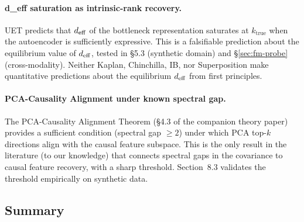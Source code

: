 \paragraph{d\_eff saturation as intrinsic-rank recovery.}
UET predicts that $d_{\mathrm{eff}}$ of the bottleneck representation saturates at
$k_\mathrm{true}$ when the autoencoder is sufficiently expressive.
This is a falsifiable prediction about the equilibrium value of $d_{\mathrm{eff}}$,
tested in §5.3 (synthetic domain) and §\ref{sec:fm-probe} (cross-modality).
Neither Kaplan, Chinchilla, IB, nor Superposition make quantitative predictions
about the equilibrium $d_{\mathrm{eff}}$ from first principles.

\paragraph{PCA-Causality Alignment under known spectral gap.}
The PCA-Causality Alignment Theorem (\S4.3 of the companion theory paper)
provides a sufficient condition (spectral gap $\geq 2$) under which
PCA top-$k$ directions align with the causal feature subspace.
This is the only result in the literature (to our knowledge) that connects
spectral gaps in the covariance to causal feature recovery, with a sharp
threshold.
Section~8.3 validates the threshold empirically on synthetic data.

\subsection{Summary}
\label{sec:cross-theory-summary}

